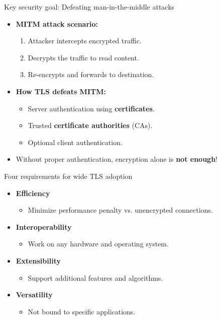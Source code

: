\documentclass[aspectratio=169, lualatex, handout]{beamer}
\begin{document}
\begin{frame}{Key security goal: Defeating man-in-the-middle attacks}
	\begin{itemize}[<+->]
		\item \textbf{MITM attack scenario:}
		      \begin{enumerate}
			      \item Attacker intercepts encrypted traffic.
			      \item Decrypts the traffic to read content.
			      \item Re-encrypts and forwards to destination.
		      \end{enumerate}
		\item \textbf{How TLS defeats MITM:}
		      \begin{itemize}
			      \item Server authentication using \textbf{certificates}.
			      \item Trusted \textbf{certificate authorities} (CAs).
			      \item Optional client authentication.
		      \end{itemize}
		\item Without proper authentication, encryption alone is \textbf{not enough}!
	\end{itemize}
\end{frame}

\begin{frame}{Four requirements for wide TLS adoption}
	\begin{itemize}[<+->]
		\item \textbf{Efficiency}
		      \begin{itemize}
			      \item Minimize performance penalty vs. unencrypted connections.
		      \end{itemize}
		\item \textbf{Interoperability}
		      \begin{itemize}
			      \item Work on any hardware and operating system.
		      \end{itemize}
		\item \textbf{Extensibility}
		      \begin{itemize}
			      \item Support additional features and algorithms.
		      \end{itemize}
		\item \textbf{Versatility}
		      \begin{itemize}
			      \item Not bound to specific applications.
		      \end{itemize}
	\end{itemize}
\end{frame}
\end{document}
